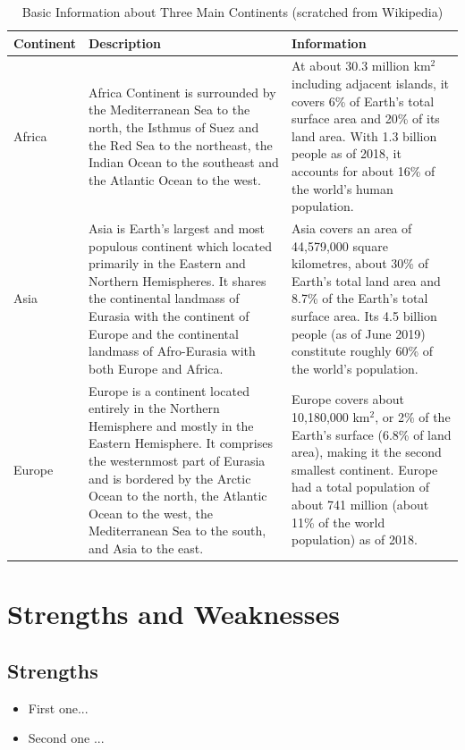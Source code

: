 \documentclass[12pt]{article}  %
\begin{document}
\begin{longtable}{ p{4em} p{14em} p{14em} }
\caption{Basic Information about Three Main Continents (scratched from Wikipedia)}
\label{tb:longtable}\\
\toprule
Continent & Description & Information \\
\midrule
Africa & Africa Continent is surrounded by the Mediterranean Sea to the
north, the Isthmus of Suez and the Red Sea to the northeast, the Indian
Ocean to the southeast and the Atlantic Ocean to the west. &
At about 30.3 million km$^2$ including adjacent islands, it covers 6\%
of Earth's total surface area and 20\% of its land area. With 1.3
billion people as of 2018, it accounts for about 16\% of the world's
human population. \\
\midrule
Asia & Asia is Earth's largest and most populous continent which
located primarily in the Eastern and Northern Hemispheres.
It shares the continental landmass of Eurasia with the continent
of Europe and the continental landmass of Afro-Eurasia with both
Europe and Africa. &
Asia covers an area of 44,579,000 square kilometres, about 30\%
of Earth's total land area and 8.7\% of the Earth's total surface
area. Its 4.5 billion people (as of June 2019) constitute roughly
60\% of the world's population. \\
\midrule
Europe & Europe is a continent located entirely in the Northern
Hemisphere and mostly in the Eastern Hemisphere. It comprises the
westernmost part of Eurasia and is bordered by the Arctic Ocean to
the north, the Atlantic Ocean to the west, the Mediterranean Sea to
the south, and Asia to the east. &
Europe covers about 10,180,000 km$^2$, or 2\% of the Earth's surface
(6.8\% of land area), making it the second smallest
continent. Europe had a total population of about 741 million (about
11\% of the world population) as of 2018. \\
\bottomrule
\end{longtable}
\section{Strengths and Weaknesses}
\subsection{Strengths}
\begin{itemize}
    \item First one...
    \item Second one ...
\end{itemize}
\end{document}
